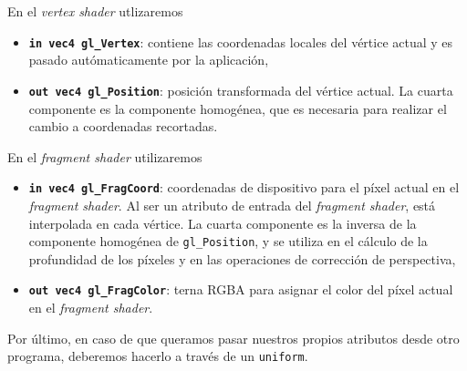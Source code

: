 En el \textit{vertex shader} utlizaremos
\begin{itemize}    
    \item \textbf{\texttt{in vec4 gl\_Vertex}}: contiene las coordenadas locales del vértice actual y es pasado autómaticamente por la aplicación,
    \item \textbf{\texttt{out vec4 gl\_Position}}: posición transformada del vértice actual. La cuarta componente es la componente homogénea, que es necesaria para realizar el cambio a coordenadas recortadas.
\end{itemize}
En el \textit{fragment shader} utilizaremos
\begin{itemize}
    \item \textbf{\texttt{in vec4 gl\_FragCoord}}: coordenadas de dispositivo para el píxel actual en el \textit{fragment shader}. Al ser un atributo de entrada del \textit{fragment shader}, está interpolada en cada vértice. La cuarta componente es la inversa de la componente homogénea de \texttt{gl\_Position}, y se utiliza en el cálculo de la profundidad de los píxeles y en las operaciones de corrección de perspectiva,
    \item \textbf{\texttt{out vec4 gl\_FragColor}}: terna RGBA para asignar el color del píxel actual en el \textit{fragment shader}.
\end{itemize}
Por último, en caso de que queramos pasar nuestros propios atributos desde otro programa, deberemos hacerlo a través de un \texttt{uniform}.\newline

